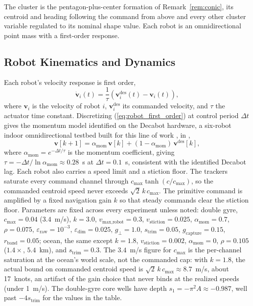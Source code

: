 \documentclass[lettersize,journal]{IEEEtran}
\begin{document}
The cluster is the pentagon-plus-center formation of
Remark~\ref{rem:conic}, its centroid and heading following the
command from above and every other cluster variable regulated to its
nominal shape value. Each robot is an omnidirectional point mass with a
first-order response.

\subsection{Robot Kinematics and Dynamics}
\label{sec:robot_model}

Each robot's velocity response is first order,
\begin{equation}
    \dot{\mathbf{v}}_i(t) = \frac{1}{\tau}\left(
    \mathbf{v}_i^{\text{des}}(t) - \mathbf{v}_i(t)\right),
    \label{eq:robot_first_order}
\end{equation}
where $\mathbf{v}_i$ is the velocity of robot $i$,
$\mathbf{v}_i^{\text{des}}$ its commanded velocity, and $\tau$ the
actuator time constant.
Discretizing (\ref{eq:robot_first_order}) at control period $\Delta t$
gives the momentum model identified on the Decabot hardware, a
six-robot indoor omnidirectional testbed built for this line of work
\cite{38,39}, in \cite{9},
\begin{equation}
    \mathbf{v}[k+1] = \alpha_{\text{mom}}\,\mathbf{v}[k]
    + (1 - \alpha_{\text{mom}})\,\mathbf{v}^{\text{des}}[k],
    \label{eq:momentum}
\end{equation}
where $\alpha_{\text{mom}} = e^{-\Delta t/\tau}$ is the momentum
coefficient, giving $\tau = -\Delta
t/\ln\alpha_{\text{mom}} \approx 0.28$~s at $\Delta t = 0.1$~s,
consistent with the identified Decabot lag. Each robot also carries a
speed limit and a stiction floor.
The trackers saturate every command channel through
$c_{\max}\tanh(c/c_{\max})$, so the commanded centroid speed never
exceeds $\sqrt{2}\,k\,c_{\max}$. The primitive command is amplified by a
fixed navigation gain $k$ so that steady commands clear the stiction
floor. Parameters are fixed across every experiment unless noted:
double gyre, $c_{\max} = 0.04$ ($3.4$~m/s), $k = 3.0$,
$v_{\text{max,robot}} = 0.3$, $v_{\text{stiction}} = 0.025$,
$\alpha_{\text{mom}} = 0.7$, $\rho = 0.075$, $\varepsilon_{\text{raw}} =
10^{-3}$, $\varepsilon_{\text{dim}} = 0.025$, $g_\perp = 1.0$,
$s_{\mathrm{trim}} = 0.05$, $g_{\text{capture}} = 0.15$, $r_{\text{band}}
= 0.05$; ocean, the same except $k = 1.8$, $v_{\text{stiction}} =
0.002$, $\alpha_{\text{mom}} = 0$, $\rho = 0.105$ ($1.4\times$, $5.4$~km),
and $s_{\mathrm{trim}} = 0.3$. The $3.4$~m/s figure for $c_{\max}$ is the
per-channel saturation at the ocean's world scale, not the commanded
cap: with $k = 1.8$, the actual bound on commanded centroid speed is
$\sqrt{2}\,k\,c_{\max} \approx 8.7$~m/s, about 17~knots, an artifact of
the gain choice that never binds at the realized speeds
(under 1~m/s). The double-gyre
core wells have depth $s_1 = -\pi^2 A \approx -0.987$, well past
$-4s_{\mathrm{trim}}$ for the values in the table.
\end{document}
